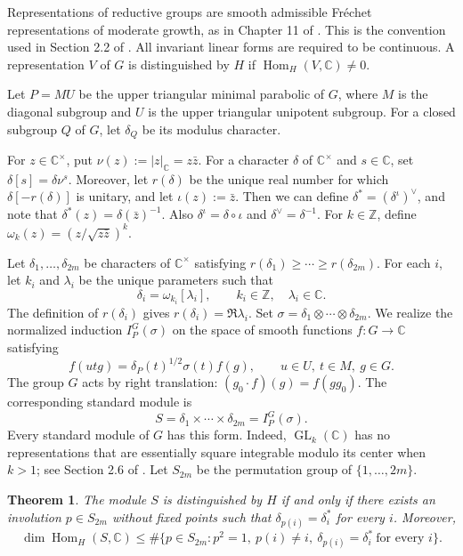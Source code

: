 \documentclass[11pt]{amsart}
\newcommand{\C}{\mathbb C}
\DeclareMathOperator{\GL}{GL}
\DeclareMathOperator{\Hom}{Hom}
\newcommand{\IP}{I_P^G}
\newtheorem{theorem}{Theorem}
\numberwithin{equation}{section}
\begin{document}
Representations of reductive groups are smooth admissible
Fr\'echet representations of moderate growth, as in
Chapter 11 of \cite{WallachII}.
This is the convention used in Section 2.2 of \cite{MOYglobal}.
All invariant linear forms are required to be continuous.
A representation $V$ of $G$ is distinguished by $H$ if
$\Hom_H(V,\C)\ne0$.

Let $P=MU$ be the upper triangular minimal parabolic of $G$, where $M$ is the diagonal subgroup and $U$ is the upper
triangular unipotent subgroup.
For a closed subgroup $Q$ of $G$, let $\delta_Q$ be its modulus
character.

For $z\in\C^\times$, put $\nu(z) := |z|_\C=z\bar z$.
For a character $\delta$ of $\C^\times$ and $s\in\C$, set
$\delta[s]=\delta\nu^s$. Moreover, let $r(\delta)$ be the unique real number for which
$\delta[-r(\delta)]$ is unitary, and let $\iota(z) := \bar z$.
Then we can define $\delta^*=(\delta^\iota)^\vee$, and note that
$\delta^*(z)=\delta(\bar z)^{-1}$. Also $\delta^\iota=\delta\circ\iota$ and
$\delta^\vee=\delta^{-1}$.
For $k\in\mathbb Z$, define $\omega_k(z)=(z/\sqrt{z\bar z})^k$.

Let $\delta_1,\ldots,\delta_{2m}$ be characters of $\C^\times$
satisfying $r(\delta_1)\ge\cdots\ge r(\delta_{2m})$.
For each $i$, let $k_i$ and $\lambda_i$ be the unique parameters
such that
\begin{equation}\label{eq:characters}
 \delta_i=\omega_{k_i}[\lambda_i],\qquad
 k_i\in\mathbb Z,\quad\lambda_i\in\C.
\end{equation}
The definition of $r(\delta_i)$ gives $r(\delta_i)=\Re\lambda_i$.
Set $\sigma=\delta_1\otimes\cdots\otimes\delta_{2m}$.
We realize the normalized induction $\IP(\sigma)$ on the space
of smooth functions $f:G\to\C$ satisfying
\[
 f(utg)=\delta_P(t)^{1/2}\sigma(t)f(g),
 \qquad u\in U,\ t\in M,\ g\in G.
\]
The group $G$ acts by right translation: $(g_0\cdot f)(g)=f(gg_0)$.
The corresponding standard module is
\begin{equation}\label{eq:standard}
 S=\delta_1\times\cdots\times\delta_{2m}=\IP(\sigma).
\end{equation}
Every standard module of $G$ has this form.
Indeed, $\GL_k(\C)$ has no representations that are essentially
square integrable modulo its center when $k>1$; see
Section 2.6 of \cite{MOYglobal}.
Let $S_{2m}$ be the permutation group of $\{1,\ldots,2m\}$.

\begin{theorem}\label{thm:main}
The module $S$ is distinguished by $H$ if and only if there
exists an involution $p\in S_{2m}$ without fixed points such that
$\delta_{p(i)}=\delta_i^*$ for every $i$.
Moreover,
\begin{equation}\label{eq:bound}
 \dim\Hom_H(S,\C)
 \le\#\{p\in S_{2m}:p^2=1,\ p(i)\ne i,\
                  \delta_{p(i)}=\delta_i^*\ \text{for every }i\}.
\end{equation}
\end{theorem}
\end{document}
